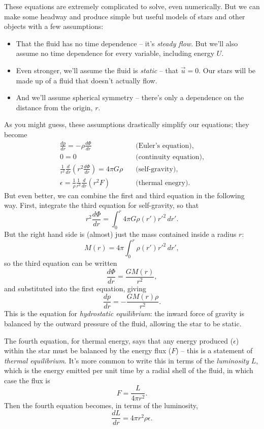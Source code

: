 These equations are extremely complicated to solve, even numerically.  But we can make some headway and produce simple but useful models of stars and other objects with a few assumptions:
\begin{itemize}
\item That the fluid has no time dependence -- it's \emph{steady flow}.  But we'll also assume no time dependence for every variable, including energy $U$.
\item Even stronger, we'll assume the fluid is \emph{static} -- that $\vec{u} = 0$.  Our stars will be made up of a fluid that doesn't actually flow.
\item And we'll assume spherical symmetry -- there's only a dependence on the distance from the origin, $r$.
\end{itemize}

As you might guess, these assumptions drastically simplify our equations; they become
\begin{align}
\frac{dp}{dr} = -\rho \frac{d\Phi}{dr}  & \quad \text{(Euler's equation),} \label{eq_star_1} \\
0 = 0 & \quad \text{(continuity equation),} \\
\frac{1}{r^2} \frac{d}{dr} \left(r^2 \frac{d\Phi}{dr} \right) = 4 \pi G \rho & \quad \text{(self-gravity),} \label{eq_star_3} \\
\epsilon = \frac{1}{\rho} \frac{1}{r^2} \frac{d}{dr} ( r^2 F) & \quad \text{(thermal enegry).} \label{eq_star_4}
\end{align}
But even better, we can combine the first and third equation in the following way.  First, integrate the third equation for self-gravity, so that
\[
r^2 \frac{d\Phi}{dr} = \int_0^r 4\pi G \rho(r') r'^2 \, dr'.
\]
But the right hand side is (almost) just the mass contained inside a radius $r$:
\[
M(r) = 4\pi \int_0^r \rho(r') r'^2 \, dr',
\]
so the third equation can be written
\begin{equation}
\frac{d\Phi}{dr} = \frac{GM(r)}{r^2},
\end{equation}
and substituted into the first equation, giving
\begin{equation}
\label{eq_star_1b}
\boxed{
\frac{dp}{dr} = - \frac{GM(r) \rho}{r^2}.
}
\end{equation}
This is the equation for \emph{hydrostatic equilibrium}: the inward force of gravity is balanced by the outward pressure of the fluid, allowing the star to be static.

The fourth equation, for thermal energy, says that any energy produced ($\epsilon$) within the star must be balanced by the energy flux ($F$) -- this is a statement of \emph{thermal equilibrium}.  It's more common to write this in terms of the \emph{luminosity} $L$, which is the energy emitted per unit time by a radial shell of the fluid, in which case the flux is
\begin{equation}
F = \frac{L}{4\pi r^2}.
\end{equation}
Then the fourth equation becomes, in terms of the luminosity,
\begin{equation}
\boxed{
\frac{dL}{dr} = 4\pi r^2 \rho \epsilon.
}
\end{equation}

